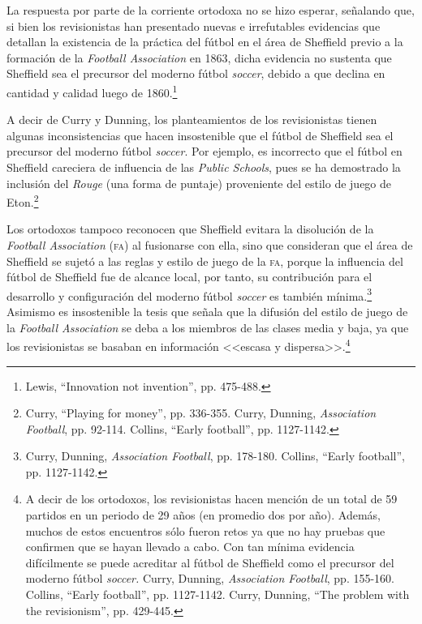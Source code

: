 \documentclass[11pt,a5paper,twoside]{book} %
\begin{document}
La respuesta por parte de la corriente ortodoxa no se hizo esperar, señalando que, si
bien los revisionistas han presentado nuevas e irrefutables evidencias que detallan la
existencia de la práctica del fútbol en el área de Sheffield previo a la formación de la \emph{Football
Association} en 1863, dicha evidencia no sustenta que Sheffield sea el precursor del moderno
fútbol \emph{soccer}, debido a que declina en cantidad y calidad luego de 1860.\footnote{Lewis, ``Innovation not invention'', pp. 475-488.}

A decir de Curry y Dunning, los planteamientos de los revisionistas tienen algunas
inconsistencias que hacen insostenible que el fútbol de Sheffield sea el precursor del moderno
fútbol \emph{soccer}. Por ejemplo, es incorrecto que el fútbol en Sheffield careciera de influencia de
las \emph{Public Schools}, pues se ha demostrado la inclusión del \emph{Rouge} (una forma de puntaje)
proveniente del estilo de juego de Eton.\footnote{Curry, ``Playing for money'', pp. 336-355. Curry, Dunning, \emph{Association Football}, pp. 92-114. Collins, ``Early football'', pp. 1127-1142.}

Los ortodoxos tampoco reconocen que Sheffield evitara la disolución de la \emph{Football
Association} (\textsc{fa}) al fusionarse con ella, sino que consideran que el área de Sheffield se sujetó
a las reglas y estilo de juego de la \textsc{fa}, porque la influencia del fútbol de Sheffield fue de
alcance local, por tanto, su contribución para el desarrollo y configuración del moderno fútbol
\emph{soccer} es también mínima.\footnote{Curry, Dunning, \emph{Association Football}, pp. 178-180. Collins, ``Early football'', pp. 1127-1142.} Asimismo es insostenible la tesis que señala que la difusión del estilo de juego de la \emph{Football Association} se deba a los miembros de las clases media y baja, ya que los revisionistas se basaban en información <<escasa y dispersa>>.\footnote{A decir de los ortodoxos, los revisionistas hacen mención de un total de 59 partidos en un periodo de 29 años (en promedio dos por año). Además, muchos de estos encuentros sólo fueron retos ya que no hay pruebas que confirmen que se hayan llevado a cabo. Con tan mínima evidencia difícilmente se puede acreditar al fútbol de Sheffield como el precursor del moderno fútbol \emph{soccer.} Curry, Dunning, \emph{Association Football}, pp. 155-160. Collins, ``Early football'', pp. 1127-1142. Curry, Dunning, ``The problem with the revisionism'', pp. 429-445.}
\end{document}
